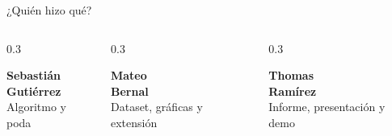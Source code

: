 \documentclass[aspectratio=169, 10pt]{beamer}
\begin{document}
\begin{frame}{¿Quién hizo \alert{qué?}}
  \vspace{0.3cm}
  \begin{columns}[c]
    \begin{column}{0.3\textwidth}
      \begin{tarjeta}
        \begin{center}
          {\large\faCode\par}\vspace{4pt}
          {\small\bfseries Sebastián\\Gutiérrez}\\[3pt]
          {\footnotesize\color{cgris} Algoritmo y poda}
        \end{center}
      \end{tarjeta}
    \end{column}
    \begin{column}{0.3\textwidth}
      \begin{tarjeta}
        \begin{center}
          {\large\faChartBar\par}\vspace{4pt}
          {\small\bfseries Mateo\\Bernal}\\[3pt]
          {\footnotesize\color{cgris} Dataset, gráficas y extensión}
        \end{center}
      \end{tarjeta}
    \end{column}
    \begin{column}{0.3\textwidth}
      \begin{tarjeta}
        \begin{center}
          {\large\faFileAlt\par}\vspace{4pt}
          {\small\bfseries Thomas\\Ramírez}\\[3pt]
          {\footnotesize\color{cgris} Informe, presentación y demo}
        \end{center}
      \end{tarjeta}
    \end{column}
  \end{columns}
\end{frame}
\end{document}
